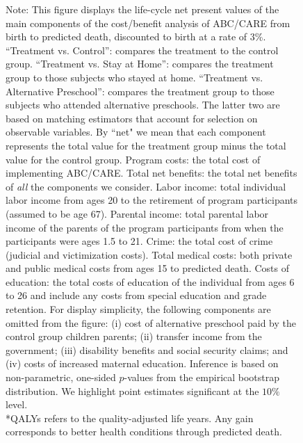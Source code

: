 \begin{figure}
{Note: This figure displays the life-cycle net present values of the main components of the cost/benefit analysis of ABC/CARE from birth to predicted death, discounted to birth at a rate of 3\%. ``Treatment vs. Control'': compares the treatment to the control group. ``Treatment vs. Stay at Home'': compares the treatment group to those subjects who stayed at home. ``Treatment vs. Alternative Preschool'': compares the treatment group to those subjects who attended alternative preschools. The latter two are based on matching estimators that account for selection on observable variables. By ``net" we mean that each component represents the total value for the treatment group minus the total value for the control group. Program costs: the total cost of implementing ABC/CARE. Total net benefits: the total net benefits of \textit{all} the components we consider. Labor income: total individual labor income from ages 20 to the retirement of program participants  (assumed to be age 67). Parental income: total parental labor income of the parents of the program participants from when the participants were ages 1.5 to 21. Crime: the total cost of crime (judicial and victimization costs). Total medical costs: both private and public medical costs from ages 15 to predicted death. Costs of education: the total costs of education of the individual from ages 6 to 26 and include any costs from special education and grade retention. For display simplicity, the following components are omitted from the figure: (i) cost of alternative preschool paid by the control group children parents; (ii) transfer income from the government; (iii) disability benefits and social security claims; and (iv) costs of increased maternal education. Inference is based on non-parametric, one-sided $p$-values from the empirical bootstrap distribution. We highlight point estimates significant at the $10\%$ level.\\
*QALYs refers to the quality-adjusted life years. Any gain corresponds to better health conditions through predicted death.\\
}
\end{figure}

